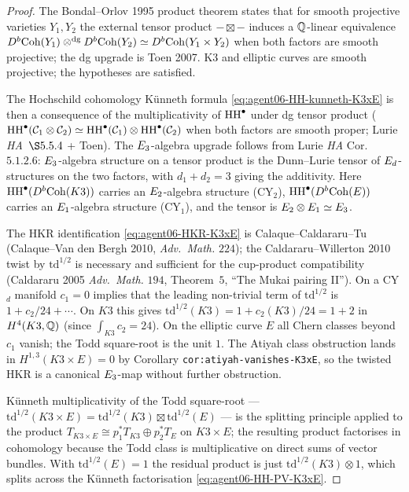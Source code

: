 \begin{proof}
The Bondal--Orlov 1995 product theorem states that for smooth projective
varieties $Y_1, Y_2$ the external tensor product $- \boxtimes -$ induces
a $\mathbb Q$-linear equivalence
$D^b\mathrm{Coh}(Y_1) \otimes^{\mathrm{dg}} D^b\mathrm{Coh}(Y_2) \simeq D^b\mathrm{Coh}(Y_1
\times Y_2)$ when both factors are smooth projective; the dg upgrade is
Toen 2007. K3 and elliptic curves are smooth projective; the
hypotheses are satisfied.

The Hochschild cohomology K\"unneth formula
\eqref{eq:agent06-HH-kunneth-K3xE} is then a consequence of the
multiplicativity of $\mathrm{HH}^\bullet$ under dg tensor product
($\mathrm{HH}^\bullet(\mathcal C_1 \otimes \mathcal C_2) \simeq \mathrm{HH}^\bullet(\mathcal C_1)
\otimes \mathrm{HH}^\bullet(\mathcal C_2)$ when both factors are smooth
proper; Lurie \textit{HA}~$\S 5.5.4$ + Toen). The $E_3$-algebra
upgrade follows from Lurie \textit{HA} Cor.~$5.1.2.6$:
$E_3$-algebra structure on a tensor product is the Dunn--Lurie
tensor of $E_d$-structures on the two factors, with $d_1 + d_2 = 3$
giving the additivity. Here $\mathrm{HH}^\bullet(D^b\mathrm{Coh}(K3))$ carries an
$E_2$-algebra structure (CY$_2$), $\mathrm{HH}^\bullet(D^b\mathrm{Coh}(E))$ carries an
$E_1$-algebra structure (CY$_1$), and the tensor is $E_2 \otimes
E_1 \simeq E_3$.

The HKR identification \eqref{eq:agent06-HKR-K3xE} is
Calaque--Caldararu--Tu (Calaque--Van den Bergh 2010, \emph{Adv.\ Math.}
$224$); the Caldararu--Willerton 2010 twist by $\mathrm{td}^{1/2}$ is
necessary and sufficient for the cup-product compatibility (Caldararu
2005 \emph{Adv.\ Math.} $194$, Theorem~$5$, ``The Mukai pairing II'').
On a CY$_d$ manifold $c_1 = 0$ implies that the leading
non-trivial term of $\mathrm{td}^{1/2}$ is $1 + c_2/24 + \cdots$.
On $K3$ this gives $\mathrm{td}^{1/2}(K3) = 1 + c_2(K3)/24 = 1 + 2$
in $H^4(K3, \mathbb Q)$ (since $\int_{K3} c_2 = 24$). On the elliptic curve $E$
all Chern classes beyond $c_1$ vanish; the Todd square-root is the unit
$1$. The Atiyah class obstruction lands in $H^{1,3}(K3 \times E) = 0$
by Corollary \texttt{cor:atiyah-vanishes-K3xE}, so the twisted HKR is a
canonical $E_3$-map without further obstruction.

K\"unneth multiplicativity of the Todd square-root --- $\mathrm{td}^{1/2}(K3 \times E) = \mathrm{td}^{1/2}(K3) \boxtimes \mathrm{td}^{1/2}(E)$ --- is the splitting principle applied to the product
$T_{K3 \times E} \cong p_1^* T_{K3} \oplus p_2^* T_E$ on
$K3 \times E$; the resulting product factorises in cohomology because
the Todd class is multiplicative on direct sums of vector bundles. With
$\mathrm{td}^{1/2}(E) = 1$ the residual product is just
$\mathrm{td}^{1/2}(K3) \otimes 1$, which splits across the K\"unneth
factorisation \eqref{eq:agent06-HH-PV-K3xE}.
\end{proof}

